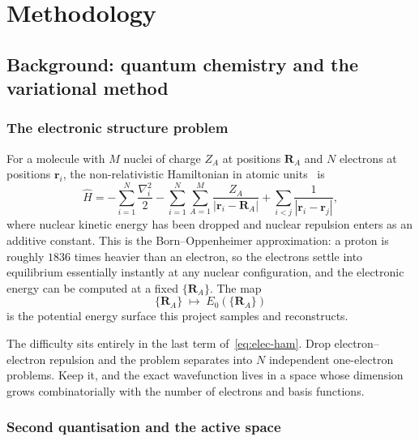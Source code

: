 \documentclass[sigconf,screen,nonacm]{acmart}
\makeatletter
\newcommand{\@resetcolroom}{%
  \ifdim\pagetotal=\z@
    \ifx\@toplist\@empty\ifx\@botlist\@empty\ifx\@midlist\@empty
      \global\@colroom\@colht
      \global\vsize\@colht
    \fi\fi\fi
  \fi}
\let\@origFloatBarrier\FloatBarrier
\renewcommand{\FloatBarrier}{\@origFloatBarrier\@resetcolroom}
\makeatother
\begin{document}
\FloatBarrier
\section{Methodology}
\label{sec:method}

\subsection{Background: quantum chemistry and the variational method}
\label{sec:theory}
\subsubsection{The electronic structure problem}

For a molecule with $M$ nuclei of charge $Z_A$ at positions $\mathbf{R}_A$ and
$N$ electrons at positions $\mathbf{r}_i$, the non-relativistic Hamiltonian in
atomic units~\cite{szabo,helgaker} is
\begin{equation}
\hat{H} = -\sum_{i=1}^{N}\frac{\nabla_i^2}{2}
          -\sum_{i=1}^{N}\sum_{A=1}^{M}\frac{Z_A}{|\mathbf{r}_i-\mathbf{R}_A|}
          +\sum_{i<j}\frac{1}{|\mathbf{r}_i-\mathbf{r}_j|},
\label{eq:elec-ham}
\end{equation}
where nuclear kinetic energy has been dropped and nuclear repulsion enters as
an additive constant. This is the Born--Oppenheimer approximation: a proton
is roughly $1836$ times heavier than an electron, so the electrons settle
into equilibrium essentially instantly at any nuclear configuration, and the
electronic energy can be computed at a fixed $\{\mathbf{R}_A\}$. The map
\begin{equation}
\{\mathbf{R}_A\} \;\longmapsto\; E_0(\{\mathbf{R}_A\})
\end{equation}
is the potential energy surface this project samples and reconstructs.

The difficulty sits entirely in the last term of~\eqref{eq:elec-ham}. Drop
electron--electron repulsion and the problem separates into $N$ independent
one-electron problems. Keep it, and the exact wavefunction lives in a space
whose dimension grows combinatorially with the number of electrons and basis
functions.

\subsubsection{Second quantisation and the active space}
\end{document}
